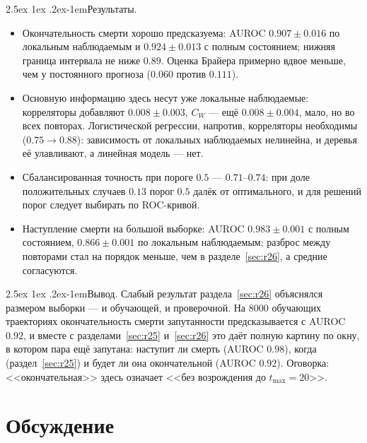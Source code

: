 \documentclass[12pt,a4paper]{report}
\makeatletter
\renewcommand\paragraph{\@startsection{paragraph}{4}{\z@}%
  {2.5ex \@plus1ex \@minus.2ex}{-1em}{\normalfont\normalsize\bfseries}}
\numberwithin{equation}{chapter}
\makeatother
\begin{document}
\paragraph{Результаты.}
\begin{itemize}
\item Окончательность смерти хорошо предсказуема: AUROC $0.907\pm0.016$ по
      локальным наблюдаемым и $0.924\pm0.013$ с полным состоянием; нижняя
      граница интервала не ниже $0.89$. Оценка Брайера примерно вдвое
      меньше, чем у постоянного прогноза ($0.060$ против $0.111$).
\item Основную информацию здесь несут уже локальные наблюдаемые: корреляторы
      добавляют $0.008\pm0.003$, $C_W$ --- ещё $0.008\pm0.004$, мало, но во всех
      повторах. Логистической регрессии, напротив, корреляторы необходимы
      ($0.75\to0.88$): зависимость от локальных наблюдаемых нелинейна, и
      деревья её улавливают, а линейная модель --- нет.
\item Сбалансированная точность при пороге $0.5$ --- $0.71$--$0.74$: при доле
      положительных случаев $0.13$ порог $0.5$ далёк от оптимального, и для
      решений порог следует выбирать по ROC-кривой.
\item Наступление смерти на большой выборке: AUROC $0.983\pm0.001$ с полным
      состоянием, $0.866\pm0.001$ по локальным наблюдаемым; разброс между
      повторами стал на порядок меньше, чем в разделе~\ref{sec:r26}, а
      средние согласуются.
\end{itemize}

\paragraph{Вывод.} Слабый результат раздела~\ref{sec:r26} объяснялся
размером выборки --- и обучающей, и проверочной. На 8000 обучающих
траекториях окончательность смерти запутанности предсказывается с AUROC
$0.92$, и вместе с разделами~\ref{sec:r25} и~\ref{sec:r26} это даёт полную
картину по окну, в котором пара ещё запутана: наступит ли смерть
(AUROC $0.98$), когда (раздел~\ref{sec:r25}) и будет ли она окончательной
(AUROC $0.92$). Оговорка: <<окончательная>> здесь означает <<без
возрождения до $t_{\max}=20$>>.



\chapter{Обсуждение}
\label{chap:discussion}
\end{document}
